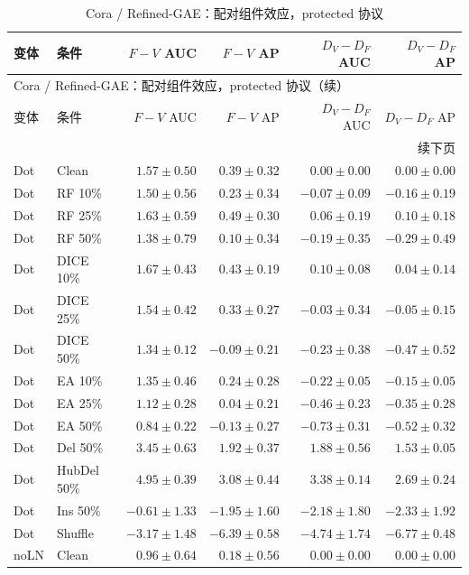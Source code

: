 {\footnotesize
\setlength{\tabcolsep}{3.2pt}
\renewcommand{\arraystretch}{1.10}
\begin{longtable}{llrrrr}
\caption{Cora / Refined-GAE：配对组件效应，protected 协议}\\
\toprule
变体 & 条件 & $F-V$ AUC & $F-V$ AP & $D_V-D_F$ AUC & $D_V-D_F$ AP \\
\midrule
\endfirsthead
\multicolumn{6}{l}{Cora / Refined-GAE：配对组件效应，protected 协议（续）}\\
\toprule
变体 & 条件 & $F-V$ AUC & $F-V$ AP & $D_V-D_F$ AUC & $D_V-D_F$ AP \\
\midrule
\endhead
\midrule\multicolumn{6}{r}{续下页}\\
\endfoot
\bottomrule
\endlastfoot
Dot & Clean & $1.57\pm0.50$ & $0.39\pm0.32$ & $0.00\pm0.00$ & $0.00\pm0.00$ \\
Dot & RF 10\% & $1.50\pm0.56$ & $0.23\pm0.34$ & $-0.07\pm0.09$ & $-0.16\pm0.19$ \\
Dot & RF 25\% & $1.63\pm0.59$ & $0.49\pm0.30$ & $0.06\pm0.19$ & $0.10\pm0.18$ \\
Dot & RF 50\% & $1.38\pm0.79$ & $0.10\pm0.34$ & $-0.19\pm0.35$ & $-0.29\pm0.49$ \\
Dot & DICE 10\% & $1.67\pm0.43$ & $0.43\pm0.19$ & $0.10\pm0.08$ & $0.04\pm0.14$ \\
Dot & DICE 25\% & $1.54\pm0.42$ & $0.33\pm0.27$ & $-0.03\pm0.34$ & $-0.05\pm0.15$ \\
Dot & DICE 50\% & $1.34\pm0.12$ & $-0.09\pm0.21$ & $-0.23\pm0.38$ & $-0.47\pm0.52$ \\
Dot & EA 10\% & $1.35\pm0.46$ & $0.24\pm0.28$ & $-0.22\pm0.05$ & $-0.15\pm0.05$ \\
Dot & EA 25\% & $1.12\pm0.28$ & $0.04\pm0.21$ & $-0.46\pm0.23$ & $-0.35\pm0.28$ \\
Dot & EA 50\% & $0.84\pm0.22$ & $-0.13\pm0.27$ & $-0.73\pm0.31$ & $-0.52\pm0.32$ \\
Dot & Del 50\% & $3.45\pm0.63$ & $1.92\pm0.37$ & $1.88\pm0.56$ & $1.53\pm0.05$ \\
Dot & HubDel 50\% & $4.95\pm0.39$ & $3.08\pm0.44$ & $3.38\pm0.14$ & $2.69\pm0.24$ \\
Dot & Ins 50\% & $-0.61\pm1.33$ & $-1.95\pm1.60$ & $-2.18\pm1.80$ & $-2.33\pm1.92$ \\
Dot & Shuffle & $-3.17\pm1.48$ & $-6.39\pm0.58$ & $-4.74\pm1.74$ & $-6.77\pm0.48$ \\
noLN & Clean & $0.96\pm0.64$ & $0.18\pm0.56$ & $0.00\pm0.00$ & $0.00\pm0.00$ \\

\end{longtable}}
